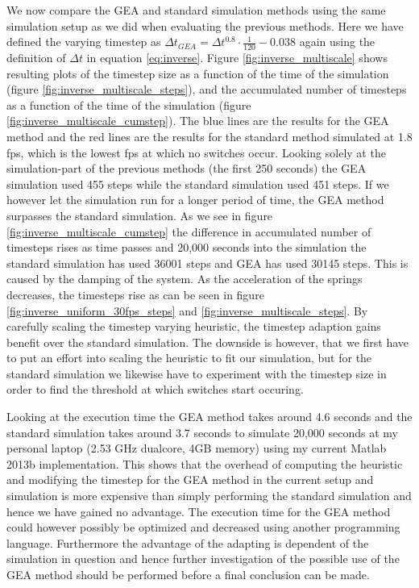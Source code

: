 \documentclass[11pt]{article}
\begin{document}
We now compare the GEA and standard simulation methods using the same
simulation setup as we did when evaluating the previous methods. Here we
have defined the varying timestep as $\Delta t_{GEA} = \Delta t^{0.8}
\cdot \frac{1}{120}-0.038$ again using the definition of $\Delta t$ in
equation \ref{eq:inverse}. Figure \ref{fig:inverse_multiscale} shows
resulting plots of the timestep size as a function of the time of the
simulation (figure \ref{fig:inverse_multiscale_steps}), and the accumulated
number of timesteps as a function of the time of the simulation (figure
\ref{fig:inverse_multiscale_cumstep}). The blue lines are the results for
the GEA method and the red lines are the results for the standard method
simulated at 1.8 fps, which is the lowest fps at which no switches occur.
Looking solely at the simulation-part of the previous methods (the first 250
seconds) the GEA simulation used 455 steps while the standard simulation
used 451 steps. If we however let the simulation run for a longer period
of time, the GEA method surpasses the standard simulation. As we see in
figure \ref{fig:inverse_multiscale_cumstep} the difference in accumulated
number of timesteps rises as time passes and 20,000 seconds into the
simulation the standard simulation has used 36001 steps and GEA has used
30145 steps. This is caused by the damping of the system. As the acceleration
of the springs decreases, the timesteps rise as can be seen in figure
\ref{fig:inverse_uniform_30fps_steps} and \ref{fig:inverse_multiscale_steps}.
By carefully scaling the timestep varying heuristic, the timestep adaption
gains benefit over the standard simulation. The downside is however, that we
first have to put an effort into scaling the heuristic to fit our simulation,
but for the standard simulation we likewise have to experiment with the
timestep size in order to find the threshold at which switches start occuring.

Looking at the execution time the GEA method takes around 4.6 seconds and the
standard simulation takes around 3.7 seconds to simulate 20,000 seconds at my
personal laptop (2.53 GHz dualcore, 4GB memory) using my current Matlab 2013b
implementation. This shows that the overhead of computing the heuristic and
modifying the timestep for the GEA method in the current setup and simulation
is more expensive than simply performing the standard simulation and hence we
have gained no advantage. The execution time for the GEA method could however
possibly be optimized and decreased using another programming language.
Furthermore the advantage of the adapting is dependent of the simulation in
question and hence further investigation of the possible use of the GEA method
should be performed before a final conclusion can be made.
\end{document}
